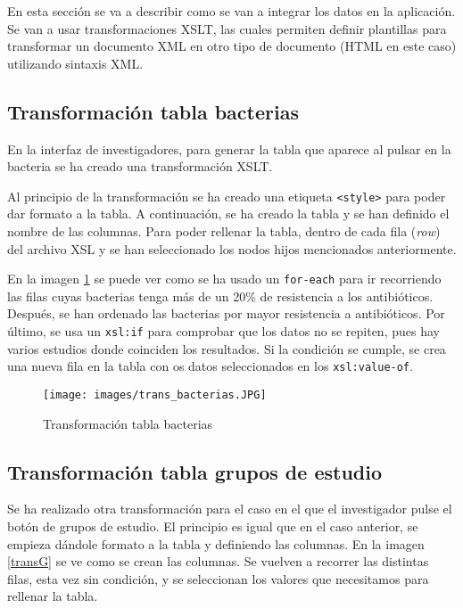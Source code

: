 \documentclass[../main.tex]{subfiles}
\begin{document}
En esta sección se va a describir como se van a integrar los datos en la aplicación. Se van a usar transformaciones XSLT, las cuales permiten definir plantillas para transformar un documento XML en otro tipo de documento (HTML en este caso) utilizando sintaxis XML.

\subsection{Transformación tabla bacterias}

En la interfaz de investigadores, para generar la tabla que aparece al pulsar en la bacteria se ha creado una transformación XSLT.

\hfill

Al principio de la transformación se ha creado una etiqueta \texttt{<style>} para poder dar formato a la tabla. A continuación, se ha creado la tabla y se han definido el nombre de las columnas. Para poder rellenar la tabla, dentro de cada fila (\textit{row}) del archivo XSL y se han seleccionado los nodos hijos mencionados anteriormente.

\hfill

En la imagen \ref{transB} se puede ver como se ha usado un \texttt{for-each} para ir recorriendo las filas cuyas bacterias tenga más de un 20\% de resistencia a los antibióticos. Después, se han ordenado las bacterias por mayor resistencia a antibióticos. Por último, se usa un \texttt{xsl:if} para comprobar que los datos no se repiten, pues hay varios estudios donde coinciden los resultados. Si la condición se cumple, se crea una nueva fila en la tabla con os datos seleccionados en los \texttt{xsl:value-of}.

\newpage

\begin{figure}[h]
    \centering
    \texttt{[image: images/trans\_bacterias.JPG]}
    \caption{Transformación tabla bacterias}
    \label{transB}
\end{figure}

\subsection{Transformación tabla grupos de estudio}

Se ha realizado otra transformación para el caso en el que el investigador pulse el botón de grupos de estudio. El principio es igual que en el caso anterior, se empieza dándole formato a la tabla y definiendo las columnas. En la imagen \ref{transG} se ve como se crean las columnas. Se vuelven a recorrer las distintas filas, esta vez sin condición, y se seleccionan los valores que necesitamos para rellenar la tabla.
\end{document}

